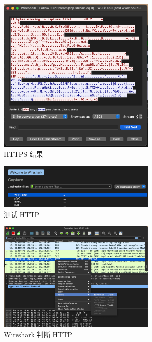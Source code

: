 \begin{figure}[htb]
\centering 
\includegraphics[width=0.70\textwidth]{img/ch1s4m5.png} 
\caption{HTTPS 结果}
\label{Test}
\end{figure}

\begin{figure}[htb]
\centering 
\includegraphics[width=0.70\textwidth]{img/ch1s4m6.png} 
\caption{测试 HTTP}
\label{Test}
\end{figure}

\begin{figure}[htb]
\centering 
\includegraphics[width=0.70\textwidth]{img/ch1s4m7.png} 
\caption{Wireshark 判断 HTTP}
\label{Test}
\end{figure}

